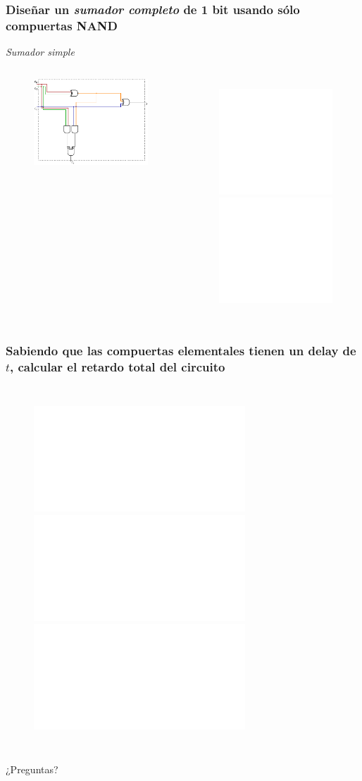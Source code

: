 \documentclass[mathserif,hyperref]{beamer}
\begin{document}
\begin{frame}[t]
\frametitle{\small Diseñar un \textit{sumador completo} de 1 bit usando sólo
compuertas NAND}
\textit{Sumador simple}
\begin{columns}[T]
  \begin{figure}[htp]
    \includegraphics[scale=0.9]{sumador-completo.pdf}
  \end{figure}

  \begin{figure}[htp]
    \includegraphics<1>[scale=0.9]{sumador-simple.pdf}
    \includegraphics<2>[scale=0.9]{sumador-completo.pdf}
  \end{figure}
\end{columns}
\end{frame}


\begin{frame}[t]
\frametitle{\small Sabiendo que las compuertas elementales tienen un delay
de $t$, calcular el retardo total del circuito}
\begin{columns}
  \begin{figure}[htp]
    \includegraphics<1-2>[scale=0.9]{sumador-completo.pdf}
    \includegraphics<3>[scale=0.6]{sumador-simple.pdf}
    \includegraphics<4->[scale=0.9]{sumador-completo.pdf}
  \end{figure}
  \pause
  
\end{columns}
\end{frame}


\begin{frame}
\begin{center}\Large ¿Preguntas?\end{center}
\end{frame}
\end{document}
